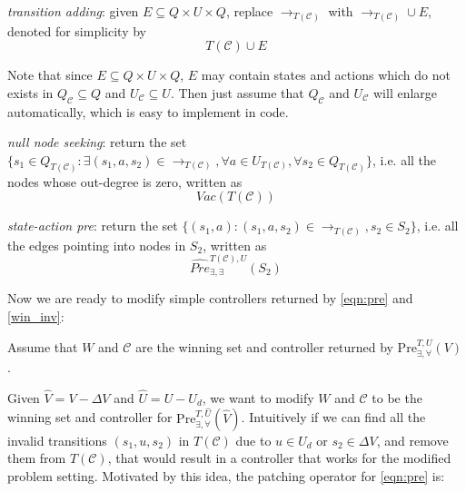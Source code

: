 \emph{transition adding}: given $ E \subseteq Q \times U \times Q$, replace $ \rightarrow_{T(\mathcal{C})} $ with $ \rightarrow_{T(\mathcal{C})}\cup E $, denoted for simplicity by
\begin{displaymath}
T(\mathcal{C})\cup E
\end{displaymath}

Note that since $ E \subseteq Q\times U\times Q $, $ E $ may contain states and actions which do not exists in $ Q_{\mathcal{C}}\subseteq Q $ and $ U_{\mathcal{C}}\subseteq U $. Then just assume that $ Q_{\mathcal{C}} $ and $ U_{\mathcal{C}} $ will enlarge automatically, which is easy to implement in code.

\emph{null node seeking}: return the set $\{s_1\in Q_{T(\mathcal{C})}: \exists (s_1,a,s_2)\in \rightarrow_{T(\mathcal{C})},\forall a\in U_{T(\mathcal{C})}, \forall s_2 \in Q_{T(\mathcal{C})}\} $, i.e. all the nodes whose out-degree is zero, written as
\begin{displaymath}
Vac(T(\mathcal{C}))
\end{displaymath}

\emph{state-action pre}: return the set $ \{(s_1,a): (s_1,a,s_2)\in \rightarrow_{T(\mathcal{C})}, s_2\in S_2\} $, i.e. all the edges pointing into nodes in $ S_2 $, written as
\begin{displaymath}
\widehat{Pre}^{T(\mathcal{C}),U}_{\exists,\exists}(S_2)
\end{displaymath}

Now we are ready to modify simple controllers returned by \eqref{eqn:pre} and \eqref{win_inv}:

Assume that  $ W $ and $ \mathcal{C} $ are the winning set and controller returned by $ \text{Pre}_{\exists,\forall}^{T, U}(V) $. 

Given $ \widehat{V}= V-\Delta V $ and $ \widehat{U} = U-U_d $, we want to modify $ W $ and $ \mathcal{C} $ to be the winning set and controller for $ \text{Pre}_{\exists,\forall}^{T,\widehat{U}}(\widehat{V}) $. Intuitively if we can find all the invalid transitions $ (s_1,u,s_2) $ in $ T(\mathcal{C}) $ due to $ u\in U_d $ or $ s_2\in\Delta V $, and remove them from $ T(\mathcal{C}) $, that would result in a controller that works for the modified problem setting. Motivated by this idea, the patching operator for \eqref{eqn:pre} is:


